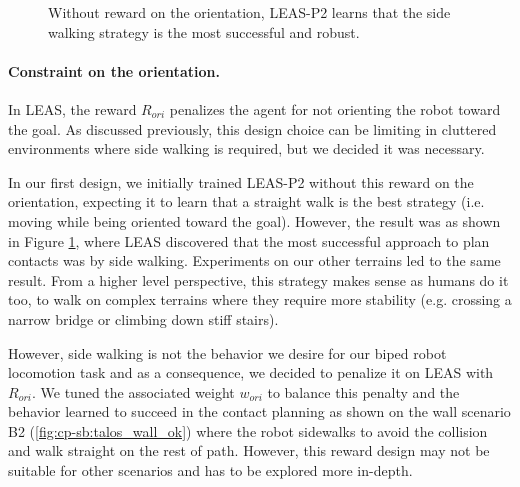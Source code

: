 \begin{figure}[h]
\begin{subfigure}[t]{0.19\linewidth}
    \end{subfigure}
    \caption{Without reward on the orientation, LEAS-P2 learns that the side walking strategy is the most successful and robust.}
    \label{fig:cp-sb:sidewalk_seq}
\end{figure}
\paragraph{Constraint on the orientation.}
In LEAS, the reward $R_{ori}$ penalizes the agent for not orienting the robot toward the goal. 
As discussed previously, this design choice can be limiting in cluttered environments where side walking is required, but we decided it was necessary.

In our first design, we initially trained LEAS-P2 without this reward on the orientation, expecting it to learn that a straight walk is the best strategy (i.e. moving while being oriented toward the goal). 
However, the result was as shown in Figure \ref{fig:cp-sb:sidewalk_seq}, where LEAS discovered that the most successful approach to plan contacts was by side walking.
Experiments on our other terrains led to the same result. 
From a higher level perspective, this strategy makes sense as humans do it too, to walk on complex terrains where they require more stability (e.g. crossing a narrow bridge or climbing down stiff stairs).

However, side walking is not the behavior we desire for our biped robot locomotion task and as a consequence, we decided to penalize it on LEAS with $R_{ori}$. We tuned the associated weight $w_{ori}$ to balance this penalty and the behavior learned to succeed in the contact planning as shown on the wall scenario B2 (\ref{fig:cp-sb:talos_wall_ok}) where the robot sidewalks to avoid the collision and walk straight on the rest of path. However, this reward design may not be suitable for other scenarios and has to be explored more in-depth.

